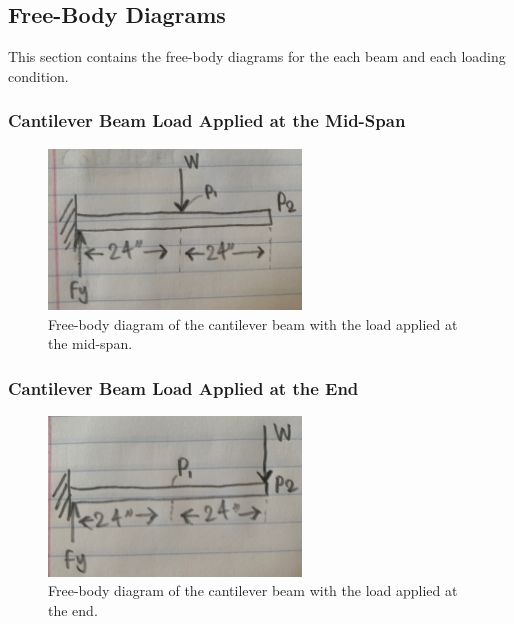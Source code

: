 \documentclass[12pt, titlepage]{article}
\begin{document}
\subsection{Free-Body Diagrams}
This section contains the free-body diagrams for the each beam and each loading
condition.
\subsubsection{Cantilever Beam Load Applied at the Mid-Span}
\begin{figure}[H]
    \centering
    \includegraphics[width=0.6\textwidth]{./Images/C_mid.jpg}
    \caption{Free-body diagram of the cantilever beam with the load applied at
    the mid-span.}
    \label{fig:CantileverBeamMid}
\end{figure}
\subsubsection{Cantilever Beam Load Applied at the End}
\begin{figure}[H]
    \centering
    \includegraphics[width=0.6\textwidth]{./Images/C_end.jpg}
    \caption{Free-body diagram of the cantilever beam with the load applied at
    the end.}
    \label{fig:CantileverBeamEnd}
\end{figure}
\end{document}
